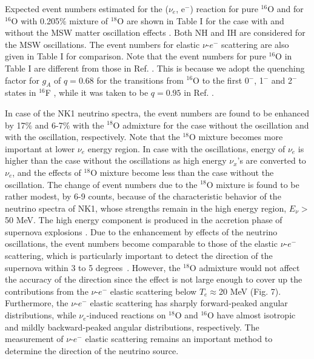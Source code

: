 \documentclass[preprint,12pt]{elsarticle}
\begin{document}
Expected event numbers estimated for the ($\nu_e$, e$^{-}$) reaction for pure $^{16}$O and for $^{16}$O with 0.205$\%$ mixture of $^{18}$O are shown in Table I for the case with and without the MSW matter oscillation effects \cite{Dighe,Naka2013}.
Both NH and IH are considered for the MSW oscillations.
The event numbers for elastic $\nu$-$e^{-}$ scattering are also given in Table I for comparison. 
Note that the event numbers for pure $^{16}$O in Table I are different from those in Ref. \cite{Nakazato2018}.
This is because we adopt the quenching factor for $g_A$ of $q=0.68$ for the transitions from $^{16}$O to the first 0$^{-}$, 1$^{-}$ and 2$^{-}$ states in $^{16}$F \cite{PTEP2022}, while it was taken to be $q =0.95$ in Ref. \cite{Nakazato2018}.

In case of the NK1 neutrino spectra, the event numbers are found to be enhanced by 17$\%$ and 6-7$\%$  
with the $^{18}$O admixture
for the case without the oscillation and  with the oscillation, respectively.
Note that the $^{18}$O mixture becomes more important at lower $\nu_e$ energy region. 
In case with the oscillations, energy of $\nu_e$ is higher than the case without the oscillations as high energy $\nu_x$'s are converted to $\nu_e$, and the effects of $^{18}$O mixture become less than the case without the oscillation. 
The change of event numbers due to the $^{18}$O mixture is found to be rather modest, by 6-9 counts, 
because of the characteristic behavior of the neutrino spectra of NK1, whose strengths remain in the high energy region, $E_{\nu}>$ 50 MeV. 
The high energy component is produced in the accretion phase of supernova explosions \cite{Naka2013}.   
Due to the enhancement by effects of the neutrino oscillations, the event numbers become comparable to those of the elastic $\nu$-$e^{-}$ scattering, which is particularly important to detect the direction of the supernova within 3 to 5 degrees~\cite{superK}.
However, the $^{18}$O admixture would not affect the accuracy of the direction since the effect is not large enough to cover up the contributions from the $\nu$-$e^{-}$ elastic scattering below $T_e\approx$20 MeV (Fig. 7). 
Furthermore, the $\nu$-$e^{-}$ elastic scattering has sharply forward-peaked angular distributions, while $\nu_e$-induced reactions on $^{18}$O and $^{16}$O have almost isotropic and mildly backward-peaked angular distributions, respectively.
The measurement of $\nu$-$e^{-}$ elastic scattering remains an important method to determine the direction of the neutrino source.
\end{document}
